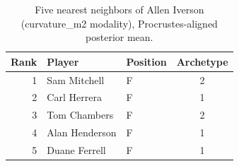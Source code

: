 \begin{table}[htbp]
  \centering\small
  \begin{tabular}{rllc}
    \toprule
    Rank & Player & Position & Archetype \\
    \midrule
    1 & Sam Mitchell & F & 2 \\
    2 & Carl Herrera & F & 1 \\
    3 & Tom Chambers & F & 2 \\
    4 & Alan Henderson & F & 1 \\
    5 & Duane Ferrell & F & 1 \\
    \bottomrule
  \end{tabular}
  \caption{Five nearest neighbors of Allen Iverson (curvature_m2 modality), Procrustes-aligned posterior mean.}
  \label{tab:Allen_Iverson_neighbors_curvature_m2}
\end{table}

